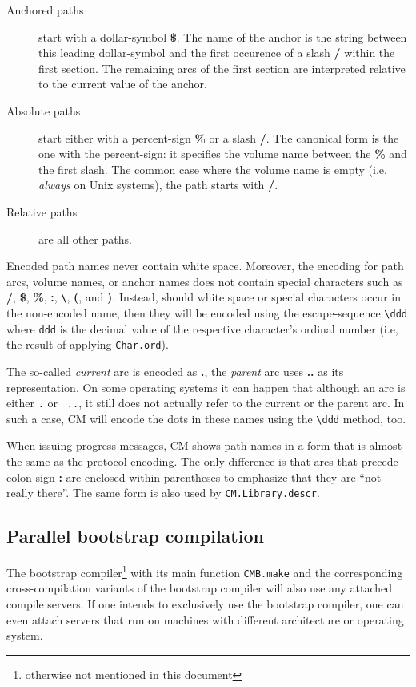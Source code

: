 \documentclass[titlepage,letterpaper]{article}
\begin{document}
\begin{description}
\item[Anchored paths] start with a dollar-symbol {\bf \$}.  The name
of the anchor is the string between this leading dollar-symbol and the
first occurence of a slash {\bf /} within the first section.  The
remaining arcs of the first section are interpreted relative to the
current value of the anchor.
\item[Absolute paths] start either with a percent-sign {\bf \%} or a
slash {\bf /}.  The canonical form is the one with the percent-sign:
it specifies the volume name between the {\bf \%} and the first slash.
The common case where the volume name is empty (i.e, {\em always} on
Unix systems), the path starts with {\bf /}.
\item[Relative paths] are all other paths.
\end{description}

Encoded path names never contain white space.  Moreover, the encoding
for path arcs, volume names, or anchor names does not contain special
characters such as {\bf /}, {\bf \$}, {\bf \%}, {\bf :}, {\bf
\verb|\|}, {\bf (}, and {\bf )}.  Instead, should white space or
special characters occur in the non-encoded name, then they will be
encoded using the escape-sequence \verb|\ddd| where {\tt ddd} is the
decimal value of the respective character's ordinal number (i.e, the
result of applying {\tt Char.ord}).

The so-called {\em current} arc is encoded as {\bf .}, the {\em
parent} arc uses {\bf ..} as its representation.  On some operating
systems it can happen that although an arc is either {\tt .} or {\tt
..}, it still does not actually refer to the current or the parent
arc.  In such a case, CM will encode the dots in these names using the
\verb|\ddd| method, too.

When issuing progress messages, CM shows path names in a form that is
almost the same as the protocol encoding.  The only difference is that
arcs that precede colon-sign {\bf :} are enclosed within parentheses
to emphasize that they are ``not really there''.  The same form is
also used by {\tt CM.Library.descr}.

\subsection{Parallel bootstrap compilation}

The bootstrap compiler\footnote{otherwise not mentioned in this
document} with its main function {\tt CMB.make} and the corresponding
cross-compilation variants of the bootstrap compiler will also use any
attached compile servers.  If one intends to exclusively use the
bootstrap compiler, one can even attach servers that run on machines
with different architecture or operating system.
\end{document}
